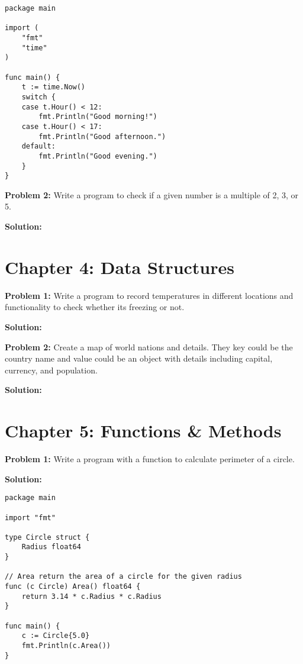 \begin{lstlisting}[numbers=none]
package main

import (
    "fmt"
    "time"
)

func main() {
    t := time.Now()
    switch {
    case t.Hour() < 12:
        fmt.Println("Good morning!")
    case t.Hour() < 17:
        fmt.Println("Good afternoon.")
    default:
        fmt.Println("Good evening.")
    }
}
\end{lstlisting}

\textbf{Problem 2:} Write a program to check if a given number is a multiple of 2, 3, or 5.

\textbf{Solution:}



\section*{Chapter 4: Data Structures}

\textbf{Problem 1:} Write a program to record temperatures
in different locations and functionality to check whether its freezing or not.

\textbf{Solution:}



\textbf{Problem 2:} Create a map of world nations and details. They key could
be the country name and value could be an object with details including capital,
currency, and population.

\textbf{Solution:}



\section*{Chapter 5: Functions \& Methods}

\textbf{Problem 1:} Write a program with a function to calculate perimeter of a circle.

\textbf{Solution:}

\begin{lstlisting}[numbers=none]
package main

import "fmt"

type Circle struct {
    Radius float64
}

// Area return the area of a circle for the given radius
func (c Circle) Area() float64 {
    return 3.14 * c.Radius * c.Radius
}

func main() {
    c := Circle{5.0}
    fmt.Println(c.Area())
}
\end{lstlisting}

